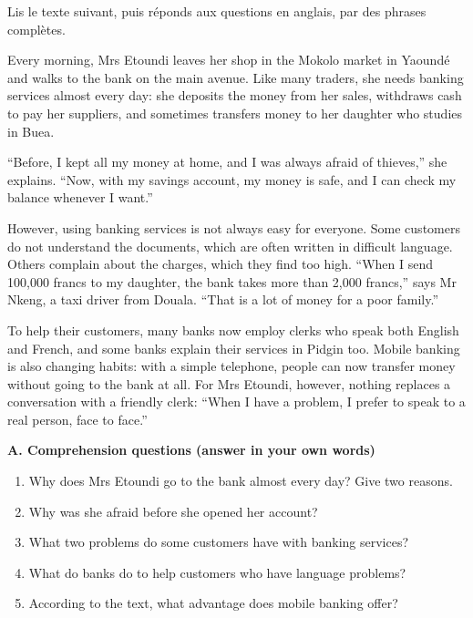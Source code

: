 \documentclass[11pt]{article}
\newcounter{popsec}
\newcounter{popsub}
\newcommand{\courssub}[1]{%
  \stepcounter{popsub}%
  \par\vspace{9pt}\noindent{\popxbold\fontsize{11.5}{13}\selectfont\color{popink}{\color{poporange}\thepopsec.\thepopsub}\hspace{6pt}#1}\par\nopagebreak\vspace{4pt}
}
\begin{document}
\courssub{Je me prépare au Bac}

\begin{exercice}
Lis le texte suivant, puis réponds aux questions en anglais, par des phrases complètes.

\begin{textebox}
Every morning, Mrs Etoundi leaves her shop in the Mokolo market in Yaoundé and walks to the bank on the main avenue. Like many traders, she needs banking services almost every day: she deposits the money from her sales, withdraws cash to pay her suppliers, and sometimes transfers money to her daughter who studies in Buea.

“Before, I kept all my money at home, and I was always afraid of thieves,” she explains. “Now, with my savings account, my money is safe, and I can check my balance whenever I want.”

However, using banking services is not always easy for everyone. Some customers do not understand the documents, which are often written in difficult language. Others complain about the charges, which they find too high. “When I send 100,000 francs to my daughter, the bank takes more than 2,000 francs,” says Mr Nkeng, a taxi driver from Douala. “That is a lot of money for a poor family.”

To help their customers, many banks now employ clerks who speak both English and French, and some banks explain their services in Pidgin too. Mobile banking is also changing habits: with a simple telephone, people can now transfer money without going to the bank at all. For Mrs Etoundi, however, nothing replaces a conversation with a friendly clerk: “When I have a problem, I prefer to speak to a real person, face to face.”
\end{textebox}

\textbf{A. Comprehension questions (answer in your own words)}

\begin{enumerate}
\item Why does Mrs Etoundi go to the bank almost every day? Give two reasons.
\item Why was she afraid before she opened her account?
\item What two problems do some customers have with banking services?
\item What do banks do to help customers who have language problems?
\item According to the text, what advantage does mobile banking offer?
\end{enumerate}


\end{exercice}
\end{document}
